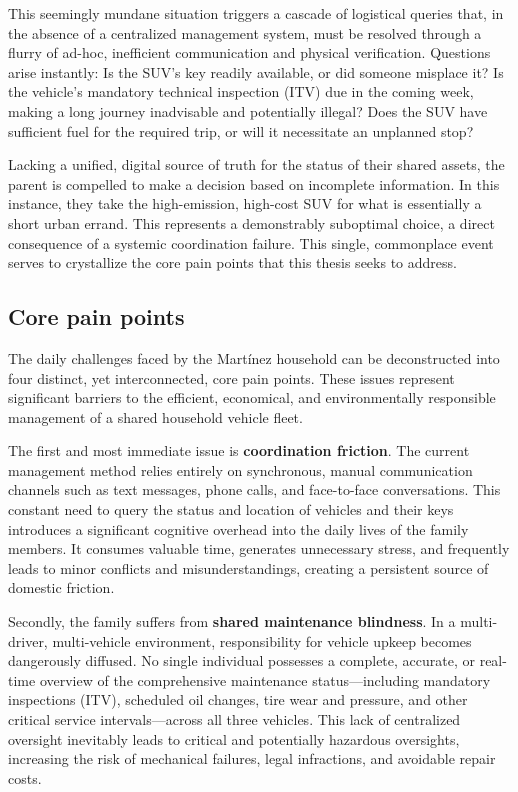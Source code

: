 \textgap

This seemingly mundane situation triggers a cascade of logistical queries that, in the absence of a centralized management system, must be resolved through a flurry of ad-hoc, inefficient communication and physical verification. Questions arise instantly: Is the SUV's key readily available, or did someone misplace it? Is the vehicle's mandatory technical inspection (ITV) due in the coming week, making a long journey inadvisable and potentially illegal? Does the SUV have sufficient fuel for the required trip, or will it necessitate an unplanned stop?

\textgap

Lacking a unified, digital source of truth for the status of their shared assets, the parent is compelled to make a decision based on incomplete information. In this instance, they take the high-emission, high-cost SUV for what is essentially a short urban errand. This represents a demonstrably suboptimal choice, a direct consequence of a systemic coordination failure. This single, commonplace event serves to crystallize the core pain points that this thesis seeks to address.

\subsection{Core pain points}

The daily challenges faced by the Martínez household can be deconstructed into four distinct, yet interconnected, core pain points. These issues represent significant barriers to the efficient, economical, and environmentally responsible management of a shared household vehicle fleet.

\textgap

The first and most immediate issue is \textbf{coordination friction}. The current management method relies entirely on synchronous, manual communication channels such as text messages, phone calls, and face-to-face conversations. This constant need to query the status and location of vehicles and their keys introduces a significant cognitive overhead into the daily lives of the family members. It consumes valuable time, generates unnecessary stress, and frequently leads to minor conflicts and misunderstandings, creating a persistent source of domestic friction.

\textgap

Secondly, the family suffers from \textbf{shared maintenance blindness}. In a multi-driver, multi-vehicle environment, responsibility for vehicle upkeep becomes dangerously diffused. No single individual possesses a complete, accurate, or real-time overview of the comprehensive maintenance status—including mandatory inspections (ITV), scheduled oil changes, tire wear and pressure, and other critical service intervals—across all three vehicles. This lack of centralized oversight inevitably leads to critical and potentially hazardous oversights, increasing the risk of mechanical failures, legal infractions, and avoidable repair costs.

